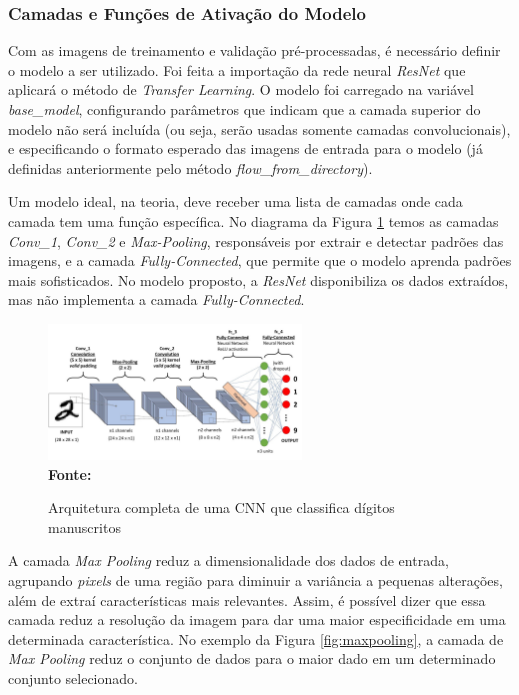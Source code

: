 
\subsubsection{\esp Camadas e Funções de Ativação do Modelo} \label{camadas}
Com as imagens de treinamento e validação pré-processadas, é necessário definir o modelo a ser utilizado. Foi feita a importação da rede neural \textit{ResNet} que aplicará o método de \textit{Transfer Learning}. O modelo foi carregado na variável \textit{base\_model}, configurando parâmetros que indicam que a camada superior do modelo não será incluída (ou seja, serão usadas somente camadas convolucionais), e especificando o formato esperado das imagens de entrada para o modelo (já definidas anteriormente pelo método \textit{flow\_from\_directory}).

Um modelo ideal, na teoria, deve receber uma lista de camadas onde cada camada tem uma função específica. No diagrama da Figura \ref{fig:cnn} temos as camadas \textit{Conv\_1}, \textit{Conv\_2} e \textit{Max-Pooling}, responsáveis por extrair e detectar padrões das imagens, e a camada \textit{Fully-Connected}, que permite que o modelo aprenda padrões mais sofisticados. No modelo proposto, a \textit{ResNet} disponibiliza os dados extraídos, mas não implementa a camada \textit{Fully-Connected}.

\begin{figure}[ht]
 	\centering	
 	\caption[\hspace{0.1cm}Grade Computacional.]{Arquitetura completa de uma CNN que classifica dígitos manuscritos}
 	\vspace{-0.4cm}
 	\includegraphics[width=0.6\textwidth]{figuras/cnn.png}
 	\captionsetup{justification=centering}
	\vspace{-0.2cm}
     \\\textbf{\footnotesize Fonte: \cite{towardsdatascienceimage}}
	\label{fig:cnn}
\end{figure}

A camada \textit{Max Pooling} reduz a dimensionalidade dos dados de entrada, agrupando \textit{pixels} de uma região para diminuir a variância a pequenas alterações, além de extraí características mais relevantes. Assim, é possível dizer que essa camada reduz a resolução da imagem para dar uma maior especificidade em uma determinada característica. No exemplo da Figura \ref{fig:maxpooling}, a camada de \textit{Max Pooling} reduz o conjunto de dados para o maior dado em um determinado conjunto selecionado.

